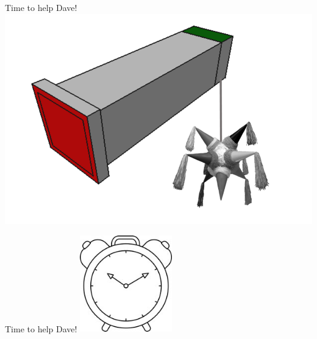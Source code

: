 \begin{frame}{Time to help Dave!}
	\includegraphics[width=1.0\textwidth, center]{Pictures/FirstHalf/pinata.pdf}
\end{frame}

\begin{frame}{Time to help Dave!}
	\includegraphics[width=0.3\textwidth, center]{Pictures/FirstHalf/alarm}
\end{frame}